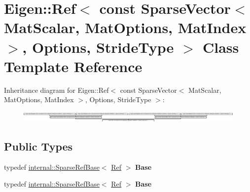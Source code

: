 \hypertarget{class_eigen_1_1_ref_3_01const_01_sparse_vector_3_01_mat_scalar_00_01_mat_options_00_01_mat_index673660e6a13ed7a7b712b0f75a25d720}{}\section{Eigen\+:\+:Ref$<$ const Sparse\+Vector$<$ Mat\+Scalar, Mat\+Options, Mat\+Index $>$, Options, Stride\+Type $>$ Class Template Reference}
\label{class_eigen_1_1_ref_3_01const_01_sparse_vector_3_01_mat_scalar_00_01_mat_options_00_01_mat_index673660e6a13ed7a7b712b0f75a25d720}
Inheritance diagram for Eigen\+:\+:Ref$<$ const Sparse\+Vector$<$ Mat\+Scalar, Mat\+Options, Mat\+Index $>$, Options, Stride\+Type $>$\+:\begin{figure}[H]
\begin{center}
\leavevmode
\includegraphics[height=0.591549cm]{class_eigen_1_1_ref_3_01const_01_sparse_vector_3_01_mat_scalar_00_01_mat_options_00_01_mat_index673660e6a13ed7a7b712b0f75a25d720}
\end{center}
\end{figure}
\subsection*{Public Types}
\begin{DoxyCompactItemize}
\item 
\mbox{\label{class_eigen_1_1_ref_3_01const_01_sparse_vector_3_01_mat_scalar_00_01_mat_options_00_01_mat_index673660e6a13ed7a7b712b0f75a25d720_a6e1728c5274bd6aaa6aaaed0ccd4b8d3}} 
typedef \hyperlink{class_eigen_1_1internal_1_1_sparse_ref_base}{internal\+::\+Sparse\+Ref\+Base}$<$ \hyperlink{group___core___module_class_eigen_1_1_ref}{Ref} $>$ {\bfseries Base}
\item 
\mbox{\label{class_eigen_1_1_ref_3_01const_01_sparse_vector_3_01_mat_scalar_00_01_mat_options_00_01_mat_index673660e6a13ed7a7b712b0f75a25d720_a6e1728c5274bd6aaa6aaaed0ccd4b8d3}} 
typedef \hyperlink{class_eigen_1_1internal_1_1_sparse_ref_base}{internal\+::\+Sparse\+Ref\+Base}$<$ \hyperlink{group___core___module_class_eigen_1_1_ref}{Ref} $>$ {\bfseries Base}
\end{DoxyCompactItemize}
